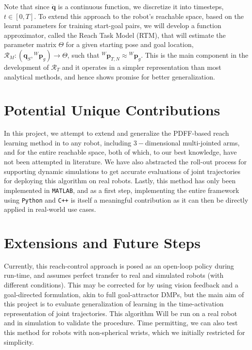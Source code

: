 \documentclass[10pt]{article}
\begin{document}
Note that since $\ddot{\mathbf{q}}$ is a continuous function, we discretize it into timesteps, $t \in [0, T]$. To extend this approach to the robot's reachable space, based on the learnt parameters for training start-goal pairs, we will develop a function approximator, called the Reach Task Model (RTM), that will estimate the parameter matrix $\Theta$ for a given starting pose and goal location, $\mathcal{R}_M: (\mathbf{q}_S, {^W}\mathbf{p}_{g}) \rightarrow \Theta$, such that ${^W}\mathbf{p}_{T,N} \approx {^W}\mathbf{p}_{g}$. This is the main component in the development of $\mathcal{R}_T$ and it operates in a simpler representation than most analytical methods, and hence shows promise for better generalization.

\section{Potential Unique Contributions}
In this project, we attempt to extend and generalize the PDFF-based reach learning method in \cite{pdff} to any robot, including $3-$dimensional multi-jointed arms, and for the entire reachable space, both of which, to our best knowledge, have not been attempted in literature. We have also abstracted the roll-out process for supporting dynamic simulations to get accurate evaluations of joint trajectories for deploying this algorithm on real robots. Lastly, this method has only been implemented in \texttt{MATLAB}, and as a first step, implementing the entire framework using \texttt{Python} and \texttt{C++} is itself a meaningful contribution as it can then be directly applied in real-world use cases.

\section{Extensions and Future Steps}
Currently, this reach-control approach is posed as an open-loop policy during run-time, and assumes perfect transfer to real and simulated robots (with different conditions). This may be corrected for by using vision feedback and a goal-directed formulation, akin to full goal-attractor DMPs, but the main aim of this project is to evaluate generalization of learning in the time-activation representation of joint trajectories. This algorithm Will be run on a real robot and in simulation to validate the procedure. Time permitting, we can also test this method for robots with non-spherical wrists, which we initially restricted for simplicity.
\end{document}
